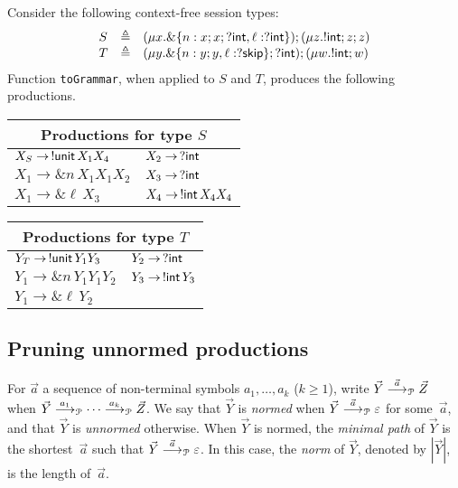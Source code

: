 \begin{example}
\label{ex:productions}
Consider the following context-free session types:
%
\begin{equation*}
\begin{array}{lll}
    S & \triangleq & (\mu x . \&\{n: x;x;?\intk, \ell: ?\intk\});(\mu z . !\intk ; z;z)\\
    T & \triangleq & (\mu y . \&\{n: y;y, \ell: ?\skipk\};?\intk);(\mu w. !\intk ; w)
\end{array}
\end{equation*}
%
Function \lstinline{toGrammar}, when applied to $S$ and $T$, produces
the following productions.
\begin{center}
  \begin{tabular}{l l}
    \multicolumn{2}{c}{Productions for type $S$}\\ \hline
    $X_S \rightarrow \,\initialProd\, X_1 X_4$ &$X_2 \rightarrow \,? \intk$\\
    $X_1 \rightarrow \& n\, X_1 X_1 X_2$&$X_3 \rightarrow \,? \intk$\\
    $X_1 \rightarrow \& \ell\, X_3$ &$X_4 \rightarrow \,!\intk\, X_4 X_4$\\
  \end{tabular} \qquad
  \begin{tabular}{l l}
    \multicolumn{2}{c}{Productions for type $T$}\\ \hline
    $Y_T \rightarrow \,\initialProd\, Y_1 Y_3 $&$Y_2 \rightarrow \,? \intk$\\
    $Y_1 \rightarrow \& n\, Y_1 Y_1 Y_2 $&$Y_3 \rightarrow \,!\intk\, Y_3$\\
    $Y_1 \rightarrow \& \ell \,Y_2 $ &
  \end{tabular}
\end{center}
\end{example}

\subsection{Pruning unnormed productions}
\label{subsec:prune}

For $\vec a$ a sequence of non-terminal symbols $a_1,\ldots, a_k$
($k\ge1$), write $\vec Y \LTSderivesP[\vec a] \vec Z$ when
$\vec Y \LTSderivesP[a_1] \cdots \LTSderivesP[a_k] \vec Z$.
%
We say that $\vec Y$ is \emph{normed} when
$\vec Y \LTSderivesP[\vec a] \varepsilon$ for some~$\vec a$, and that
$\vec Y$ is \emph{unnormed} otherwise.
%
When $\vec Y$ is normed, the \emph{minimal path} of $\vec Y$ is the
shortest~$\vec a$ such that $\vec Y \LTSderivesP[\vec a]
\varepsilon$.
%
In this case, the \emph{norm} of $\vec Y$, denoted by $|\vec Y|$, is
the length of~$\vec a$.

